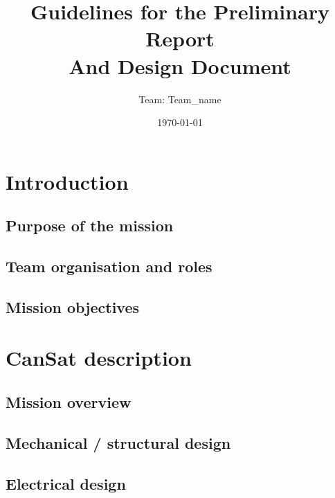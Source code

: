 \documentclass[11pt]{article}
\title{Guidelines for the Preliminary Report\\
And Design Document
}
\author{Team: Team_name}
\date{\today}
\begin{document}

\tableofcontents
\pagestyle{plain}

\newpage

\section{Introduction}

\subsection{Purpose of the mission}

\subsection{Team organisation and roles}

\subsection{Mission objectives}


\section{CanSat description}

\subsection{Mission overview}

\subsection{Mechanical / structural design}

\subsection{Electrical design}
\end{document}
